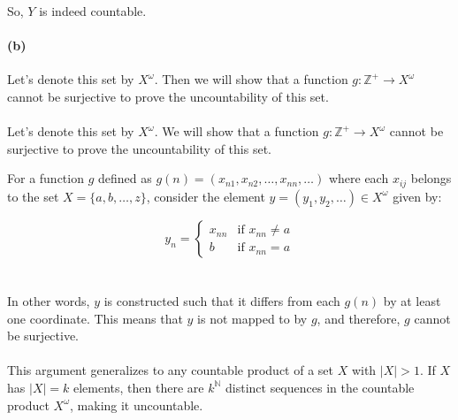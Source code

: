 \documentclass[12pt]{article}
\begin{document}
So, \(Y\) is indeed countable.


\paragraph{(b)}
Let's denote this set by \(X^{\omega}\). Then we will show that a function \(g : \mathbb{Z}^+ \rightarrow X^{\omega}\) cannot be surjective
to prove the uncountability of this set.
\\ \\
Let's denote this set by \(X^\omega\). We will show that a function \(g:\mathbb{Z}^+ \rightarrow X^\omega\) cannot be surjective to prove the uncountability of this set.

For a function \(g\) defined as \(g(n) = (x_{n1}, x_{n2}, \ldots, x_{nn}, \ldots)\) where each \(x_{ij}\) belongs to the set \(X = \{a, b, \ldots, z\}\), consider the element \(y = (y_1, y_2, \ldots) \in X^\omega\) given by:

\[
y_n = 
\begin{cases}
    x_{nn} & \text{if } x_{nn} \neq a \\
    b & \text{if } x_{nn} = a
\end{cases}
\]
\\ \\
In other words, \(y\) is constructed such that it differs from each \(g(n)\) by at least one coordinate. This means that \(y\) is not mapped to by \(g\), and therefore, \(g\) cannot be surjective.
\\ \\
This argument generalizes to any countable product of a set \(X\) with \(\lvert X \rvert > 1\). If \(X\) has \(\lvert X \rvert = k\) elements, then there are \(k^{\mathbb{N}}\) distinct sequences in the countable product \(X^\omega\), making it uncountable.
\end{document}
